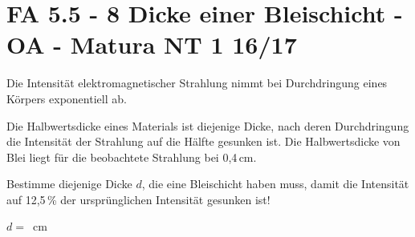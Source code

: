 \section{FA 5.5 - 8 Dicke einer Bleischicht - OA - Matura NT 1 16/17}

\begin{beispiel}[FA 5.5]{1} %
Die Intensität elektromagnetischer Strahlung nimmt bei Durchdringung eines Körpers exponentiell ab.

Die Halbwertsdicke eines Materials ist diejenige Dicke, nach deren Durchdringung die Intensität der Strahlung auf die Hälfte gesunken ist. Die Halbwertsdicke von Blei liegt für die beobachtete Strahlung bei 0,4\,cm.

Bestimme diejenige Dicke $d$, die eine Bleischicht haben muss, damit die Intensität auf 12,5\,\% der ursprünglichen Intensität gesunken ist!\leer

$d=$ \,cm
\end{beispiel}